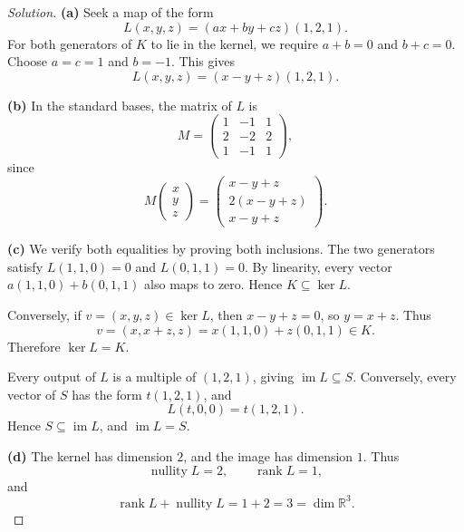 \begin{proof}[Solution]
  \textbf{(a)} Seek a map of the form
    \[
      L(x,y,z)=(ax+by+cz)(1,2,1).
    \]
    For both generators of \(K\) to lie in the kernel, we require
    \(a+b=0\) and \(b+c=0\). Choose
    \(a=c=1\) and \(b=-1\). This gives
    \[
      L(x,y,z)=(x-y+z)(1,2,1).
    \]

  \textbf{(b)} In the standard bases, the matrix of \(L\) is
    \[
      M=
      \begin{pmatrix}
        1&-1&1\\
        2&-2&2\\
        1&-1&1
      \end{pmatrix},
    \]
    since
    \[
      M\begin{pmatrix}x\\y\\z\end{pmatrix}
        =\begin{pmatrix}x-y+z\\2(x-y+z)\\x-y+z\end{pmatrix}.
    \]

  \textbf{(c)} We verify both equalities by proving both inclusions.
    The two generators satisfy
    \(L(1,1,0)=0\) and \(L(0,1,1)=0\). By linearity, every vector
    \(a(1,1,0)+b(0,1,1)\) also maps to zero. Hence
    \(K\subseteq\ker L\).

    Conversely, if \(v=(x,y,z)\in\ker L\), then \(x-y+z=0\),
    so \(y=x+z\). Thus
    \[
      v=(x,x+z,z)=x(1,1,0)+z(0,1,1)\in K.
    \]
    Therefore \(\ker L=K\).

    Every output of \(L\) is a multiple of \((1,2,1)\), giving
    \(\operatorname{im}L\subseteq S\). Conversely, every vector of \(S\)
    has the form \(t(1,2,1)\), and
    \[
      L(t,0,0)=t(1,2,1).
    \]
    Hence \(S\subseteq\operatorname{im}L\), and
    \(\operatorname{im}L=S\).

  \textbf{(d)} The kernel has dimension \(2\), and the image has dimension \(1\).
    Thus
    \[
      \operatorname{nullity}L=2,
      \qquad
      \operatorname{rank}L=1,
    \]
    and
    \[
      \operatorname{rank}L+\operatorname{nullity}L
        =1+2=3=\dim\mathbb{R}^3.
    \]
\end{proof}

